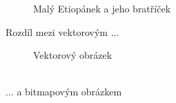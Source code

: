 \documentclass[a4paper, 11pt]{article}
\begin{document}
\begin{figure}[h]
{ }
\caption{Malý Etiopánek a jeho bratříček}
\label{obrazek1}
\end{figure}

\pagebreak

Rozdíl mezi vektorovým $\ldots$
\begin{figure}[h]
    \centering
    \caption{Vektorový obrázek}
    \label{obrazek2}
\end{figure}
\\
$\ldots$ a bitmapovým obrázkem
\end{document}
